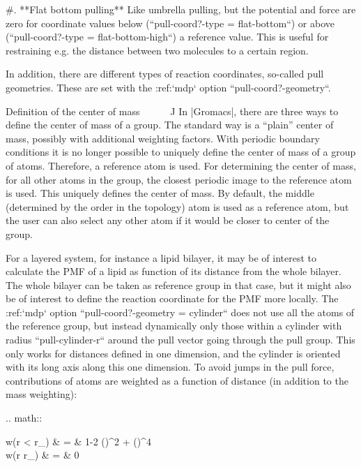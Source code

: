 #. **Flat bottom pulling** Like umbrella pulling, but the potential and
   force are zero for coordinate values below
   (``pull-coord?-type = flat-bottom``) or above
   (``pull-coord?-type = flat-bottom-high``) a reference
   value. This is useful for restraining e.g. the distance between two
   molecules to a certain region.

In addition, there are different types of reaction coordinates,
so-called pull geometries. These are set with the :ref:`mdp`
option ``pull-coord?-geometry``.

Definition of the center of mass
^^^^^^^^^^^^^^^^^^^^^^^^^^^^^^^^

In |Gromacs|, there are three ways to define the center of mass of a
group. The standard way is a “plain” center of mass, possibly with
additional weighting factors. With periodic boundary conditions it is no
longer possible to uniquely define the center of mass of a group of
atoms. Therefore, a reference atom is used. For determining the center
of mass, for all other atoms in the group, the closest periodic image to
the reference atom is used. This uniquely defines the center of mass. By
default, the middle (determined by the order in the topology) atom is
used as a reference atom, but the user can also select any other atom if
it would be closer to center of the group.

For a layered system, for instance a lipid bilayer, it may be of
interest to calculate the PMF of a lipid as function of its distance
from the whole bilayer. The whole bilayer can be taken as reference
group in that case, but it might also be of interest to define the
reaction coordinate for the PMF more locally. The :ref:`mdp`
option ``pull-coord?-geometry = cylinder`` does not use all
the atoms of the reference group, but instead dynamically only those
within a cylinder with radius ``pull-cylinder-r`` around the
pull vector going through the pull group. This only works for distances
defined in one dimension, and the cylinder is oriented with its long
axis along this one dimension. To avoid jumps in the pull force,
contributions of atoms are weighted as a function of distance (in
addition to the mass weighting):

.. math::

   \begin{aligned}
   w(r < r_) & = &
   1-2 \left(\right)^2 + \left(\right)^4 \\
   w(r \geq r_\mathrm{cyl}) & = & 0\end{aligned}

